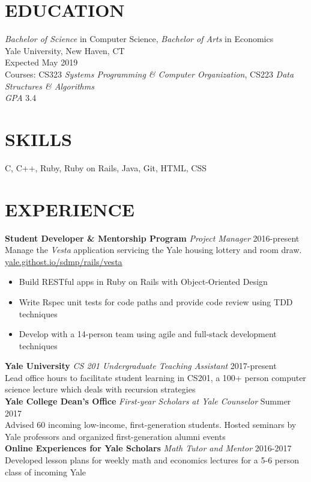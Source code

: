 \documentclass[margin, centered]{res}
\begin{document}
\address{\href{mailto:melina.delgado@yale.edu}{melina.delgado@yale.edu} | \href{http://melina-delgado.github.io/melina}{http://melina-delgado.github.io/melina} \\ 130 Prospect St, New Haven, CT 06511 | (954) 682-8999}

\begin{resume}
  \section{EDUCATION}
  \textit{Bachelor of Science} in Computer Science, \textit{Bachelor of Arts} in Economics \\
  Yale University, New Haven, CT \\
  Expected May 2019 \\
  Courses: CS323 \textit{Systems Programming \& Computer Organization}, CS223 \textit{Data Structures \& Algorithms} \\ 
  \textit{GPA} 3.4

  \section{SKILLS}
  C, C++, Ruby, Ruby on Rails, Java, Git, HTML, CSS
  

  \section{EXPERIENCE}
  \textbf{Student Developer \&  Mentorship Program} \textit{Project Manager} \hfill 2016-present \\
  Manage the \textit{Vesta} application servicing the Yale housing lottery and room draw. \\ 
  \href{https://yale.githost.io/sdmp/rails/vesta}{yale.githost.io/sdmp/rails/vesta}\smallskip{}
  \begin{itemize}
    \item Build RESTful apps in Ruby on Rails with Object-Oriented Design
    \item Write Rspec unit tests for code paths and provide code review using TDD techniques
    \item Develop with a 14-person team using agile and full-stack development techniques
  \end{itemize}
  \textbf{Yale University} \textit{CS 201 Undergraduate Teaching Assistant} \hfill 2017-present \\
  Lead office hours to facilitate student learning in CS201, a 100+ person computer science lecture which deals with recursion strategies \\ 
  \textbf{Yale College Dean's Office} \textit{First-year Scholars at Yale Counselor} \hfill Summer 2017 \\
  Advised 60 incoming low-income, first-generation students. Hosted seminars by Yale professors and organized first-generation alumni events \\
  \textbf{Online Experiences for Yale Scholars} \textit{Math Tutor and Mentor} \hfill 2016-2017 \\
  Developed lesson plans for weekly math and economics lectures for a 5-6 person class of incoming Yale 


\end{resume}
\end{document}
